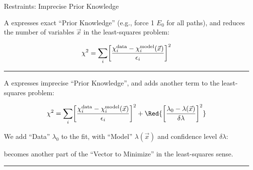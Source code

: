 \begin{slide}{Restraints: Imprecise Prior Knowledge}

    A {} expresses exact ``Prior Knowledge'' (e.g.,
    force 1 $E_0$ for all paths), and reduces the number of variables 
    $\vec{x}$ in the least-squares problem:

    \[ 
    \chi^2  =  \sum_{i}
    \biggl[ { {  \chi_{i}^{\rm data} - \chi_{i}^{\rm model}(\vec{x})
      }\over{\epsilon_i}} 
    \biggr]^2  
    \]

    \hrule \vmm
    
    A {} expresses imprecise ``Prior Knowledge'', and
    adds another term to the least-squares problem:
   
    \[ 
    \chi^2  =  \sum_{i}
    \biggl[ { {  \chi_{i}^{\rm data} - \chi_{i}^{\rm model}(\vec{x})
      }\over{\epsilon_i}} 
    \biggr]^2  
    + 
    {\Red{
     \biggl[\frac{\lambda_0 - \lambda(\vec{x})}{\delta\lambda}\biggr]^2
      }}
    \]
    
    \vmm
    
    We add ``Data'' $\lambda_0$ to the fit, with ``Model''
    $\lambda(\vec{x})$ and confidence level $\delta\lambda$:
    
    \vmm

    {\hspace{25mm}}  {\hspace{5mm}} 

    \vmm
    becomes another part of the ``Vector to Minimize'' in the least-squares
    sense.
    
    
    \vmm \hrule  \vmm 

    \begin{center}
    \end{center}

    \vmm

\vfill
\end{slide} 


